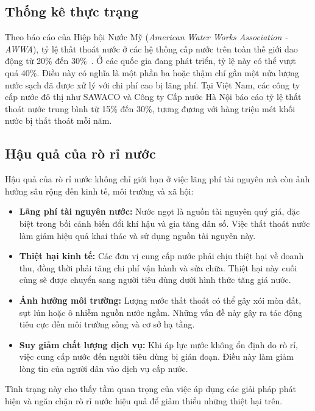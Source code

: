 \subsection{Thống kê thực trạng}
Theo báo cáo của Hiệp hội Nước Mỹ (\textit{American Water Works Association - AWWA}), tỷ lệ thất thoát nước ở các hệ thống cấp nước trên toàn thế giới dao động từ 20\% đến 30\%~\cite{AWWA_WaterLossControl}. Ở các quốc gia đang phát triển, tỷ lệ này có thể vượt quá 40\%. Điều này có nghĩa là một phần ba hoặc thậm chí gần một nửa lượng nước sạch đã được xử lý với chi phí cao bị lãng phí. Tại Việt Nam, các công ty cấp nước đô thị như SAWACO\cite{SAWACO_WaterLoss} và Công ty Cấp nước Hà Nội\cite{HN_WaterLoss} báo cáo tỷ lệ thất thoát nước trung bình từ 15\% đến 30\%, tương đương với hàng triệu mét khối nước bị thất thoát mỗi năm.

\subsection{Hậu quả của rò rỉ nước}
Hậu quả của rò rỉ nước không chỉ giới hạn ở việc lãng phí tài nguyên mà còn ảnh hưởng sâu rộng đến kinh tế, môi trường và xã hội:
\begin{itemize}
    \item \textbf{Lãng phí tài nguyên nước:} Nước ngọt là nguồn tài nguyên quý giá, đặc biệt trong bối cảnh biến đổi khí hậu và gia tăng dân số. Việc thất thoát nước làm giảm hiệu quả khai thác và sử dụng nguồn tài nguyên này.
    \item \textbf{Thiệt hại kinh tế:} Các đơn vị cung cấp nước phải chịu thiệt hại về doanh thu, đồng thời phải tăng chi phí vận hành và sửa chữa. Thiệt hại này cuối cùng sẽ được chuyển sang người tiêu dùng dưới hình thức tăng giá nước.
    \item \textbf{Ảnh hưởng môi trường:} Lượng nước thất thoát có thể gây xói mòn đất, sụt lún hoặc ô nhiễm nguồn nước ngầm. Những vấn đề này gây ra tác động tiêu cực đến môi trường sống và cơ sở hạ tầng.
    \item \textbf{Suy giảm chất lượng dịch vụ:} Khi áp lực nước không ổn định do rò rỉ, việc cung cấp nước đến người tiêu dùng bị gián đoạn. Điều này làm giảm lòng tin của người dân vào dịch vụ cấp nước.
\end{itemize}

Tình trạng này cho thấy tầm quan trọng của việc áp dụng các giải pháp phát hiện và ngăn chặn rò rỉ nước hiệu quả để giảm thiểu những thiệt hại trên.
